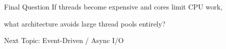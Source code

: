 \documentclass[11pt]{beamer}
\begin{document}
	\begin{frame}{Final Question}
		\Large
		If threads become expensive and cores limit CPU work,
		

		what architecture avoids large thread pools entirely?
		

		\vspace{4mm}
		\begin{alertblock}{Next Topic: Event-Driven / Async I/O}
		\end{alertblock}
	\end{frame}
	
\end{document}
